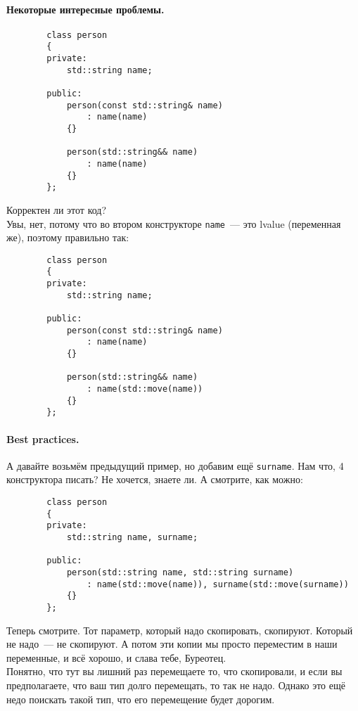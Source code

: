 \documentclass{article}
\begin{document}
    \paragraph{Некоторые интересные проблемы.}
    \begin{verbatim}
        class person
        {
        private:
            std::string name;

        public:
            person(const std::string& name)
                : name(name)
            {}

            person(std::string&& name)
                : name(name)
            {}
        };
    \end{verbatim}
    Корректен ли этот код?\\
    Увы, нет, потому что во втором конструкторе \texttt{name}~--- это lvalue (переменная же), поэтому правильно так:
    \begin{verbatim}
        class person
        {
        private:
            std::string name;
            
        public:
            person(const std::string& name)
                : name(name)
            {}
            
            person(std::string&& name)
                : name(std::move(name))
            {}
        };
    \end{verbatim}
    \paragraph{Best practices.}
    А давайте возьмём предыдущий пример, но добавим ещё \texttt{surname}. Нам что, 4 конструктора писать? Не хочется, знаете ли. А смотрите, как можно:
    \begin{verbatim}
        class person
        {
        private:
            std::string name, surname;
            
        public:
            person(std::string name, std::string surname)
                : name(std::move(name)), surname(std::move(surname))
            {}
        };
    \end{verbatim}
    Теперь смотрите. Тот параметр, который надо скопировать, скопируют. Который не надо~--- не скопируют. А потом эти копии мы просто переместим в наши переменные, и всё хорошо, и слава тебе, Буреотец.\\
    Понятно, что тут вы лишний раз перемещаете то, что скопировали, и если вы предполагаете, что ваш тип долго перемещать, то так не надо. Однако это ещё недо поискать такой тип, что его перемещение будет дорогим.
\end{document}
